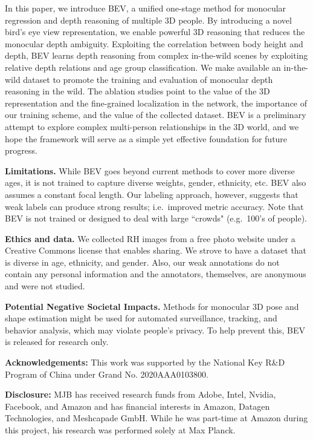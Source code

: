 \documentclass[10pt,twocolumn,letterpaper]{article}
\begin{document}
In this paper, we introduce BEV, a unified one-stage method for monocular regression and depth reasoning of multiple 3D people.
By introducing a novel bird's eye view representation, we enable powerful 3D reasoning that reduces the monocular depth ambiguity.
Exploiting the correlation between body height and depth, BEV learns depth reasoning from complex in-the-wild scenes by exploiting relative depth relations and age group classification.
We make available an in-the-wild dataset to promote the training and evaluation of monocular depth reasoning in the wild.
The ablation studies point to the value of the 3D representation and the fine-grained localization in the network, the importance of our training scheme, and the value of the collected dataset. 
BEV is a preliminary attempt to explore complex multi-person relationships in the 3D world, and we hope the framework will serve as a simple yet effective foundation for future progress. 


\textbf{Limitations.} 
While BEV goes beyond current methods to cover more diverse ages, it is not trained to capture diverse weights, gender, ethnicity, etc. 
BEV also assumes a constant focal length. 
Our labeling approach, however, suggests that weak labels can produce strong results; i.e.~improved metric accuracy.
Note that BEV is not trained or designed to deal with large ``crowds" (e.g.~100's of people). 

\textbf{Ethics and data.}
We collected RH images from a free photo website \cite{pexels} under a Creative Commons license that enables sharing.
We strove to have a dataset that is diverse in age, ethnicity, and gender.
Also, our weak annotations do not contain any personal information and the annotators, themselves, are anonymous and were not studied.

\textbf{Potential Negative Societal Impacts.}
Methods for monocular 3D pose and shape estimation might be used for automated surveillance, tracking, and behavior analysis, which may violate people's privacy. 
To help prevent this, BEV is released for research only.

\noindent \textbf{Acknowledgements:} This work was supported by the National Key R\&D Program of China under Grand No. 2020AAA0103800. 

\noindent \textbf{Disclosure:} MJB has received research funds
from Adobe, Intel, Nvidia, Facebook, and Amazon and has financial interests in Amazon, Datagen Technologies, and Meshcapade GmbH. While he was part-time at Amazon during this project, his research was performed solely at Max Planck. 


{\small


}
\end{document}
